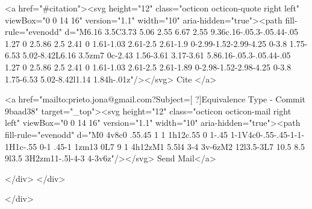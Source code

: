       <a  href="#citation"><svg height="12" class="octicon octicon-quote right left" viewBox="0 0 14 16" version="1.1" width="10" aria-hidden="true"><path fill-rule="evenodd" d="M6.16 3.5C3.73 5.06 2.55 6.67 2.55 9.36c.16-.05.3-.05.44-.05 1.27 0 2.5.86 2.5 2.41 0 1.61-1.03 2.61-2.5 2.61-1.9 0-2.99-1.52-2.99-4.25 0-3.8 1.75-6.53 5.02-8.42L6.16 3.5zm7 0c-2.43 1.56-3.61 3.17-3.61 5.86.16-.05.3-.05.44-.05 1.27 0 2.5.86 2.5 2.41 0 1.61-1.03 2.61-2.5 2.61-1.89 0-2.98-1.52-2.98-4.25 0-3.8 1.75-6.53 5.02-8.42l1.14 1.84h-.01z"/></svg> Cite
      </a>

      <a href="mailto:prieto.jona@gmail.com?Subject=[ ?]Equivalence Type - Commit 9baad38" target="_top"><svg height="12" class="octicon octicon-mail right left" viewBox="0 0 14 16" version="1.1" width="10" aria-hidden="true"><path fill-rule="evenodd" d="M0 4v8c0 .55.45 1 1 1h12c.55 0 1-.45 1-1V4c0-.55-.45-1-1-1H1c-.55 0-1 .45-1 1zm13 0L7 9 1 4h12zM1 5.5l4 3-4 3v-6zM2 12l3.5-3L7 10.5 8.5 9l3.5 3H2zm11-.5l-4-3 4-3v6z"/></svg> Send Mail</a>

    </div>
  </div>

</div>




